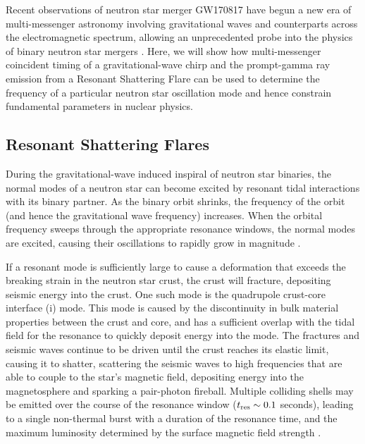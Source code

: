 \documentclass[fleqn,usenatbib]{mnras}
\begin{document}
Recent observations of neutron star merger GW170817 \citep{abbott2017gw170817,goldstein2017ordinary} have begun a new era of multi-messenger astronomy involving gravitational waves and counterparts across the electromagnetic spectrum, allowing an unprecedented probe into the physics of binary neutron star mergers \citep[see e.g. ][ and references therein]{raithel2019constraints}. Here, we will show how multi-messenger coincident timing of a gravitational-wave chirp and the prompt-gamma ray emission from a Resonant Shattering Flare can be used to determine the frequency of a particular neutron star oscillation mode and hence constrain fundamental parameters in nuclear physics.


\subsection{Resonant Shattering Flares}
\hspace{\parindent}During the gravitational-wave induced inspiral of neutron star binaries, the normal modes of a neutron star can become excited by resonant tidal interactions with its binary partner. As the binary orbit shrinks, the frequency of the orbit (and hence the gravitational wave frequency) increases. When the orbital frequency sweeps through the appropriate resonance windows, the normal modes are excited, causing their oscillations to rapidly grow in magnitude \citep{tsang2012resonant, tsang2013shattering, lai1994resonant}.

If a resonant mode is sufficiently large to cause a deformation that exceeds the breaking strain in the neutron star crust, the crust will fracture, depositing seismic energy into the crust. One such mode is the quadrupole crust-core interface (i) mode. This mode is caused by the discontinuity in bulk material properties between the crust and core, and has a sufficient overlap with the tidal field \citep{tsang2012resonant} for the resonance to quickly deposit energy into the mode. The fractures and seismic waves continue to be driven until the crust reaches its elastic limit, causing it to shatter, scattering the seismic waves to high frequencies that are able to couple to the star's magnetic field, depositing energy into the magnetosphere and sparking a pair-photon fireball. Multiple colliding shells may be emitted over the course of the resonance window ($t_{\rm res} \sim 0.1$ seconds), leading to a single non-thermal burst with a duration of the resonance time, and the maximum luminosity determined by the surface magnetic field strength \citep{tsang2013shattering}.
\end{document}
